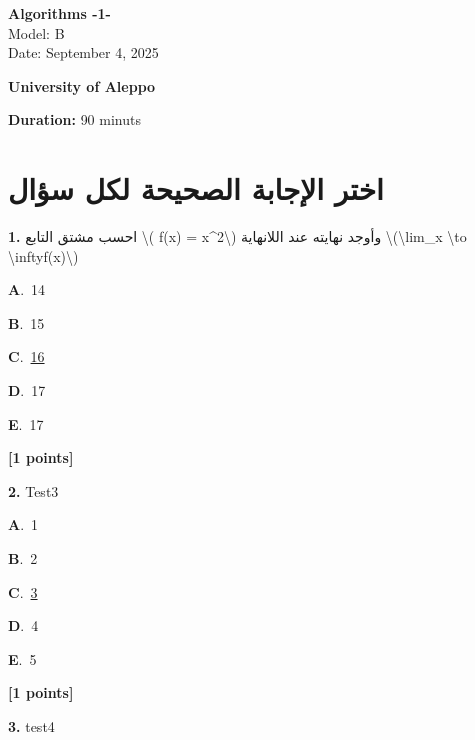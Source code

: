 \documentclass[12pt]{article}
\newcommand{\choice}[3]{%
  \noindent\textbf{#1}.~#2\hfill#3\par\vspace{0.25em}
}
\begin{document}
\begin{flushright}
{\Large \textbf{{\textenglish{Algorithms -1-}}}}\\[0.25em]
{\normalsize \textenglish{Model: }{\textenglish{B}}}\\[0.1em]
{\normalsize \textenglish{Date: }{\textenglish{September 4, 2025}}}
\end{flushright}

\vspace{0.6cm}

\noindent
\begin{minipage}[t]{0.65\textwidth}
  \raggedright
  \textbf{{\textenglish{University of Aleppo}}}\\[0.3em]
\end{minipage}\hfill
\begin{minipage}[t]{0.3\textwidth}
  \raggedleft
  \textenglish{\textbf{Duration: }}{\textenglish{90 minuts}}
\end{minipage}

\vspace{0.9cm}

\section*{اختر الإجابة الصحيحة لكل سؤال}

\noindent \textbf{\textenglish{1.}} {\textarabic{احسب مشتق التابع \textbackslash{}( f(x) = x\^{}2\textbackslash{}) وأوجد نهايته عند اللانهاية \textbackslash{}(\textbackslash{}lim\_{x \textbackslash{}to \textbackslash{}infty}f(x)\textbackslash{})}}

\noindent\choice{A}{{\textenglish{14}}}{}
\noindent\choice{B}{{\textenglish{15}}}{}
\noindent\choice{C}{\underline{{\textenglish{16}}}}{}
\noindent\choice{D}{{\textenglish{17}}}{}
\noindent\choice{E}{{\textenglish{17}}}{}
\hfill \textbf{[1 points]}\vspace{0.5em}

\noindent \textbf{\textenglish{2.}} {\textenglish{Test3}}

\noindent\choice{A}{{\textenglish{1}}}{}
\noindent\choice{B}{{\textenglish{2}}}{}
\noindent\choice{C}{\underline{{\textenglish{3}}}}{}
\noindent\choice{D}{{\textenglish{4}}}{}
\noindent\choice{E}{{\textenglish{5}}}{}
\hfill \textbf{[1 points]}\vspace{0.5em}

\noindent \textbf{\textenglish{3.}} {\textenglish{test4}}
\end{document}

